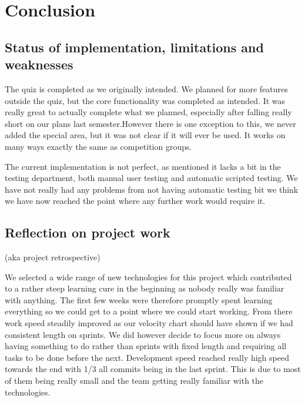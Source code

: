 \chapter{Conclusion}
\label{chap:conclusion}



\section{Status of implementation, limitations and weaknesses}
The quiz is completed as we originally intended. We planned for more features outside the quiz, but the core functionality was completed as intended. It was really great to actually complete what we planned, especially after falling really short on our plans last semester.However there is one exception to this, we never added the special area, but it was not clear  if it will ever be used. It works on many ways exactly the same as competition groups.

The current implementation is not perfect, as mentioned it lacks a bit in the testing department, both manual user testing and automatic scripted testing. We have not really had any problems from not having automatic testing bit we think we have now reached the point where any further work would require it.

\section{Reflection on project work}
(aka project retrospective)

We selected a wide range of new technologies for this project which contributed to a rather steep learning cure in the beginning as nobody really was familiar with anything. The first few weeks were therefore promptly spent learning everything so we could get to a point where we could start working. From there work speed steadily improved as our velocity chart should have shown if we had consistent length on sprints. We did however decide to focus more on always having something to do rather than sprints with fixed length and requiring all tasks to be done before the next. Development speed reached really high speed towards the end with 1/3 all commits being in the last sprint. This is due to most of them being really small and the team getting really familiar with the technologies. 

